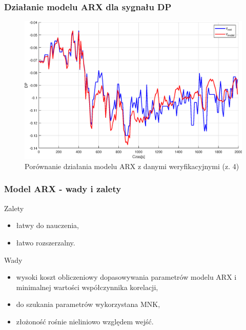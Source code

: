 \addtocounter{framenumber}{-1}
\begin{frame}
  \frametitle{Działanie modelu ARX dla sygnału DP}
  \begin{figure}[H]
    \centering
    \includegraphics[width=0.75\linewidth,keepaspectratio]{results_matlab/DP_4.eps}
    \caption{Porównanie działania modelu ARX z danymi weryfikacyjnymi (z. 4)}
    \label{fig:test}
    \end{figure}
\end{frame}

\begin{frame}
  \frametitle{Model ARX - wady i zalety}
  \begin{exampleblock}{Zalety}
    \begin{itemize}
      \item łatwy do nauczenia,
      \item łatwo rozszerzalny.
    \end{itemize}
  \end{exampleblock}
  \begin{alertblock}{Wady}
    \begin{itemize}
      \item wysoki koszt obliczeniowy dopasowywania parametrów modelu ARX i minimalnej wartości współczynnika korelacji,
      \item do szukania parametrów wykorzystana MNK,
      \item złożoność rośnie nieliniowo względem wejść.
    \end{itemize}
  \end{alertblock}
\end{frame}